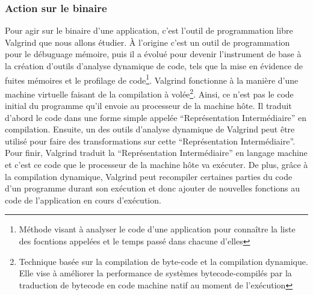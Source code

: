 \subsubsection{Action sur le binaire}
Pour agir sur le binaire d'une application, c'est l'outil de programmation libre Valgrind\cite{INTERCEPTION:Valgrind, INTERCEPTION:Valgrind_web} que nous allons étudier. À l'origine c'est un outil de programmation pour le débuguage mémoire, puis il a évolué pour devenir l'instrument de base à la création d'outils d'analyse dynamique de code, tels que la mise en évidence de fuites mémoires et le profilage de code\footnote{Méthode visant à analyser le code d'une application pour connaître la liste des focntions appelées et le temps passé dans chacune d'elles}. Valgrind fonctionne à la manière d'une machine virtuelle faisant de la compilation à volée\footnote{Technique basée sur la compilation de byte-code et la compilation dynamique. Elle vise à améliorer la performance de systèmes bytecode-compilés par la traduction de bytecode en code machine natif au moment de l'exécution}. Ainsi, ce n'est pas le code initial du programme qu'il envoie au processeur de la machine hôte. Il traduit d'abord le code dans une forme simple appelée ``Représentation Intermédiaire'' en compilation. Ensuite, un des outils d'analyse dynamique de Valgrind peut être utilisé pour faire des transformations sur cette ``Représentation Intermédiaire''. Pour finir, Valgrind traduit la ``Représentation Intermédiaire'' en langage machine et c'est ce code que le processeur de la machine hôte va exécuter. De plus, grâce à la compilation dynamique, Valgrind peut recompiler certaines parties du code d'un programme durant son exécution et donc ajouter de nouvelles fonctions au code de l'application en cours d'exécution.

